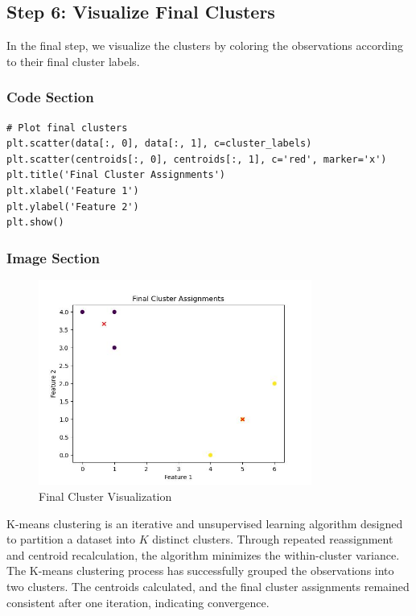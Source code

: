 \documentclass{exam}
\begin{document}
\newpage

\subsection{Step 6: Visualize Final Clusters}

In the final step, we visualize the clusters by coloring the observations according to their final cluster labels.

\subsubsection*{Code Section}

\begin{verbatim}
# Plot final clusters
plt.scatter(data[:, 0], data[:, 1], c=cluster_labels)
plt.scatter(centroids[:, 0], centroids[:, 1], c='red', marker='x')
plt.title('Final Cluster Assignments')
plt.xlabel('Feature 1')
plt.ylabel('Feature 2')
plt.show()
\end{verbatim}

\subsubsection*{Image Section}

\begin{figure}[h!]
    \centering
    \includegraphics[width=0.8\textwidth]{images/final_clusters.jpg}
    \caption{Final Cluster Visualization}
    \label{fig:final_cluster_visualization}
\end{figure}


\newpage

K-means clustering is an iterative and unsupervised learning algorithm designed to partition a dataset into \( K \) distinct clusters. Through repeated reassignment and centroid recalculation, the algorithm minimizes the within-cluster variance. The K-means clustering process has successfully grouped the observations into two clusters. The centroids calculated, and the final cluster assignments remained consistent after one iteration, indicating convergence.
\end{document}
